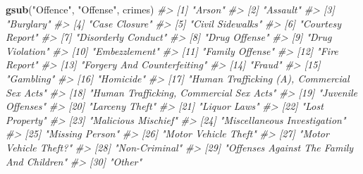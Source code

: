 \documentclass[
  12pt,
]{book}
\newenvironment{Shaded}{\begin{snugshade}}{\end{snugshade}}
\newcommand{\CommentTok}[1]{\textcolor[rgb]{0.37,0.37,0.37}{\textit{#1}}}
\newcommand{\KeywordTok}[1]{\textcolor[rgb]{0.27,0.27,0.27}{\textbf{#1}}}
\newcommand{\NormalTok}[1]{#1}
\newcommand{\StringTok}[1]{\textcolor[rgb]{0.5,0.5,0.5}{#1}}
\begin{document}
\begin{Shaded}
\begin{Highlighting}[]
\KeywordTok{gsub}\NormalTok{(}\StringTok{"Offence"}\NormalTok{, }\StringTok{"Offense"}\NormalTok{, crimes)}
\CommentTok{\#\textgreater{}  [1] "Arson"                                     }
\CommentTok{\#\textgreater{}  [2] "Assault"                                   }
\CommentTok{\#\textgreater{}  [3] "Burglary"                                  }
\CommentTok{\#\textgreater{}  [4] "Case Closure"                              }
\CommentTok{\#\textgreater{}  [5] "Civil Sidewalks"                           }
\CommentTok{\#\textgreater{}  [6] "Courtesy Report"                           }
\CommentTok{\#\textgreater{}  [7] "Disorderly Conduct"                        }
\CommentTok{\#\textgreater{}  [8] "Drug Offense"                              }
\CommentTok{\#\textgreater{}  [9] "Drug Violation"                            }
\CommentTok{\#\textgreater{} [10] "Embezzlement"                              }
\CommentTok{\#\textgreater{} [11] "Family Offense"                            }
\CommentTok{\#\textgreater{} [12] "Fire Report"                               }
\CommentTok{\#\textgreater{} [13] "Forgery And Counterfeiting"                }
\CommentTok{\#\textgreater{} [14] "Fraud"                                     }
\CommentTok{\#\textgreater{} [15] "Gambling"                                  }
\CommentTok{\#\textgreater{} [16] "Homicide"                                  }
\CommentTok{\#\textgreater{} [17] "Human Trafficking (A), Commercial Sex Acts"}
\CommentTok{\#\textgreater{} [18] "Human Trafficking, Commercial Sex Acts"    }
\CommentTok{\#\textgreater{} [19] "Juvenile Offenses"                         }
\CommentTok{\#\textgreater{} [20] "Larceny Theft"                             }
\CommentTok{\#\textgreater{} [21] "Liquor Laws"                               }
\CommentTok{\#\textgreater{} [22] "Lost Property"                             }
\CommentTok{\#\textgreater{} [23] "Malicious Mischief"                        }
\CommentTok{\#\textgreater{} [24] "Miscellaneous Investigation"               }
\CommentTok{\#\textgreater{} [25] "Missing Person"                            }
\CommentTok{\#\textgreater{} [26] "Motor Vehicle Theft"                       }
\CommentTok{\#\textgreater{} [27] "Motor Vehicle Theft?"                      }
\CommentTok{\#\textgreater{} [28] "Non{-}Criminal"                              }
\CommentTok{\#\textgreater{} [29] "Offenses Against The Family And Children"  }
\CommentTok{\#\textgreater{} [30] "Other"                                     }

\end{Highlighting}
\end{Shaded}
\end{document}
